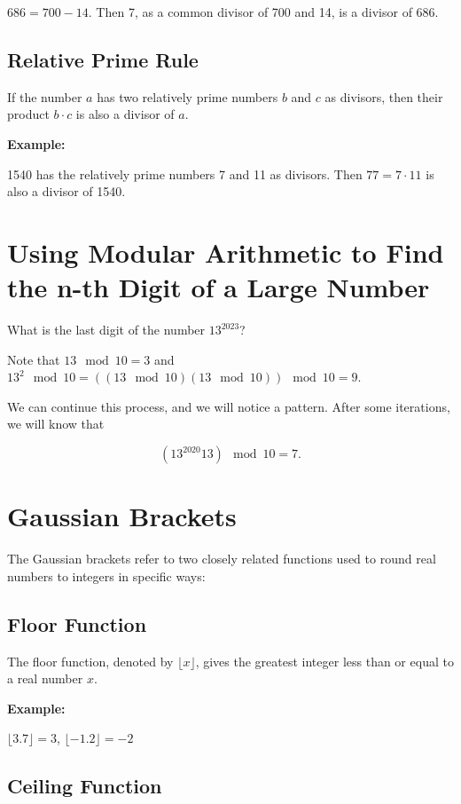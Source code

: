 \( 686 = 700 - 14 \). Then 7, as a common divisor of 700 and 14, is a divisor of 686.

\subsection*{Relative Prime Rule}

If the number \(a\) has two relatively prime numbers \(b\) and \( c \) as divisors, then their 
product \( b \cdot c \) is also a divisor of \(a\).

\textbf{Example:}

1540 has the relatively prime numbers 7 and 11 as divisors. Then \( 77 = 7 \cdot 11 \) is also a divisor 
of 1540.

\section{Using Modular Arithmetic to Find the n-th Digit of a Large Number}

What is the last digit of the number \(13^{2023}\)?

Note that \(13 \mod 10 = 3\) and  \(13^2 \mod 10 =  ((13 \mod 10)  (13\mod 10)) \mod 10 = 9 \).

We can continue this process, and we will notice a pattern. After some iterations, we will know that

\[
    (13^{2020} 13) \mod 10 = 7.
\]

\section{Gaussian Brackets}

The Gaussian brackets refer to two closely related functions used to round real numbers to integers in specific ways:

\subsection{Floor Function}

The floor function, denoted by \(\lfloor x \rfloor\), gives the greatest integer less than or equal 
to a real number \(x\).

\textbf{Example:}

\(\lfloor 3.7 \rfloor = 3\), \(\lfloor -1.2 \rfloor = -2\)

\subsection{Ceiling Function} 
    
